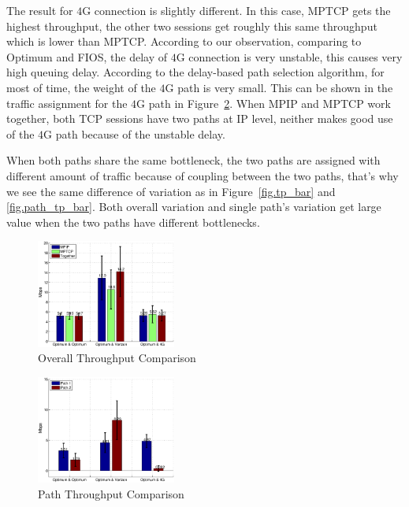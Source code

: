 The result for $4$G connection is slightly different. In this case, MPTCP gets the highest throughput, the other two sessions get roughly this same throughput which is lower than MPTCP. According to our observation, comparing to Optimum and FIOS, the delay of $4$G connection is very unstable, this causes very high queuing delay. According to the delay-based path selection algorithm, for most of time, the weight of the $4$G path is very small. This can be shown in the traffic assignment for the $4$G path in Figure~\ref{fig.emulab_patp_bar}. When MPIP and MPTCP work together, both TCP sessions have two paths at IP level, neither makes good use of the $4$G path because of the unstable delay.

When both paths share the same bottleneck, the two paths are assigned with different amount of traffic because of coupling between the two paths, that's why we see the same difference of variation as in Figure~\ref{fig.tp_bar} and \ref{fig.path_tp_bar}. Both overall variation and single path's variation get large value when the two paths have different bottlenecks.

\begin{figure}[H]
\centering
\includegraphics[width=0.8\linewidth,height=1.4in]{fig/emulab_tp_bar.eps}
\caption{Overall Throughput Comparison}
\label{fig.emulab_tp_bar}
\end{figure}


\begin{figure}[H]
\centering
\includegraphics[width=0.8\linewidth,height=1.4in]{fig/emulab_patp_bar.eps}
\caption{Path Throughput Comparison}
\label{fig.emulab_patp_bar}
\end{figure}




